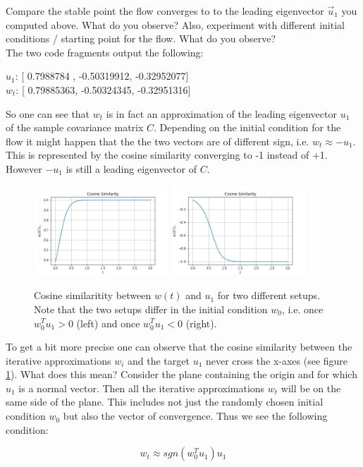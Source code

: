 Compare the stable point the flow converges to to the leading eigenvector $\vec{u}_1$ you computed above. What do you observe? Also, experiment with different initial conditions / starting point for the flow. What do you observe?
\color{blue} \\[1ex]
The two code fragments output the following:

$u_1$: [ 0.7988784 , -0.50319912, -0.32952077] \\
$w_t$: [ 0.79885363, -0.50324345, -0.32951316]

So one can see that $w_t$ is in fact an approximation of the leading eigenvector $u_1$ of the sample covariance matrix $C$. Depending on the initial condition for the flow it might happen that the the two vectors are of different sign, i.e. $w_t \approx -u_1$. This is represented by the cosine similarity converging to -1 instead of +1. However $-u_1$ is still a leading eigenvector of $C$.

\begin{figure}[h]
    \centering
    \includegraphics[width=0.45\textwidth]{Ex_02/Figures/CosSimilarity_positive.png}
    \includegraphics[width=0.45\textwidth]{Ex_02/Figures/CosSimilarity_negative.png}
    \caption{Cosine similaritity between $w(t)$ and $u_1$ for two different setups. Note that the two setups differ in the initial condition $w_0$, i.e. once $w_0^Tu_1 > 0$ (left) and once $w_0^Tu_1 < 0$ (right).}
    \label{fig:cos_sim}
\end{figure}

To get a bit more precise one can observe that the cosine similarity between the iterative approximations $w_i$ and the target $u_1$ never cross the x-axes (see figure \ref{fig:cos_sim}). What does this mean? Consider the plane containing the origin and for which $u_1$ is a normal vector. Then all the iterative approximations $w_t$ will be on the same side of the plane. This includes not just the randomly chosen initial condition $w_0$ but also the vector of convergence. Thus we see the following condition:

$$ w_t \approx sgn(w_0^Tu_1)u_1 $$

\color{black}




